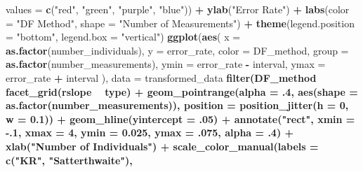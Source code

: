 \documentclass[12pt, twoside]{amherstthesis}
\newenvironment{Shaded}{\begin{snugshade}}{\end{snugshade}}
\newcommand{\DataTypeTok}[1]{\textcolor[rgb]{0.13,0.29,0.53}{#1}}
\newcommand{\DecValTok}[1]{\textcolor[rgb]{0.00,0.00,0.81}{#1}}
\newcommand{\FloatTok}[1]{\textcolor[rgb]{0.00,0.00,0.81}{#1}}
\newcommand{\KeywordTok}[1]{\textcolor[rgb]{0.13,0.29,0.53}{\textbf{#1}}}
\newcommand{\NormalTok}[1]{#1}
\newcommand{\OperatorTok}[1]{\textcolor[rgb]{0.81,0.36,0.00}{\textbf{#1}}}
\newcommand{\StringTok}[1]{\textcolor[rgb]{0.31,0.60,0.02}{#1}}
\begin{document}
\begin{Shaded}
\begin{Highlighting}[]
{{{{{{{{{{{{{                     \DataTypeTok{values =} \KeywordTok{c}\NormalTok{(}\StringTok{"red"}\NormalTok{, }\StringTok{"green"}\NormalTok{, }\StringTok{"purple"}\NormalTok{, }\StringTok{"blue"}\NormalTok{)) }\OperatorTok{+}
\StringTok{  }\KeywordTok{ylab}\NormalTok{(}\StringTok{"Error Rate"}\NormalTok{) }\OperatorTok{+}
\StringTok{  }\KeywordTok{labs}\NormalTok{(}\DataTypeTok{color =} \StringTok{"DF Method"}\NormalTok{, }\DataTypeTok{shape =} \StringTok{"Number of Measurements"}\NormalTok{) }\OperatorTok{+}
\StringTok{  }\KeywordTok{theme}\NormalTok{(}\DataTypeTok{legend.position =} \StringTok{"bottom"}\NormalTok{, }\DataTypeTok{legend.box =} \StringTok{"vertical"}\NormalTok{)}
\KeywordTok{ggplot}\NormalTok{(}\KeywordTok{aes}\NormalTok{(}
  \DataTypeTok{x =} \KeywordTok{as.factor}\NormalTok{(number_individuals), }\DataTypeTok{y =}\NormalTok{ error_rate,}
  \DataTypeTok{color =}\NormalTok{ DF_method, }\DataTypeTok{group =} \KeywordTok{as.factor}\NormalTok{(number_measurements), }
  \DataTypeTok{ymin =}\NormalTok{ error_rate }\OperatorTok{-}\StringTok{ }\NormalTok{interval, }\DataTypeTok{ymax =}\NormalTok{ error_rate }\OperatorTok{+}\StringTok{ }\NormalTok{interval}
\NormalTok{), }\DataTypeTok{data =}\NormalTok{ transformed_data }\OperatorTok{%>%}\StringTok{ }
\StringTok{  }\KeywordTok{filter}\NormalTok{(DF_method }\OperatorTok{%in%}\StringTok{ }\KeywordTok{c}\NormalTok{(}\StringTok{"KR_t1err_1"}\NormalTok{, }\StringTok{"S_t1err_1"}\NormalTok{))) }\OperatorTok{+}
\StringTok{  }\KeywordTok{facet_grid}\NormalTok{(rslope }\OperatorTok{~}\StringTok{ }\NormalTok{type) }\OperatorTok{+}
\StringTok{  }\KeywordTok{geom_pointrange}\NormalTok{(}\DataTypeTok{alpha =} \FloatTok{.4}\NormalTok{, }\KeywordTok{aes}\NormalTok{(}\DataTypeTok{shape =} \KeywordTok{as.factor}\NormalTok{(number_measurements)), }
                  \DataTypeTok{position =} \KeywordTok{position_jitter}\NormalTok{(}\DataTypeTok{h =} \DecValTok{0}\NormalTok{, }\DataTypeTok{w =} \FloatTok{0.1}\NormalTok{)) }\OperatorTok{+}
\StringTok{  }\KeywordTok{geom_hline}\NormalTok{(}\DataTypeTok{yintercept =} \FloatTok{.05}\NormalTok{) }\OperatorTok{+}
\StringTok{  }\KeywordTok{annotate}\NormalTok{(}\StringTok{"rect"}\NormalTok{, }\DataTypeTok{xmin =} \FloatTok{-.1}\NormalTok{, }\DataTypeTok{xmax =} \DecValTok{4}\NormalTok{, }\DataTypeTok{ymin =} \FloatTok{0.025}\NormalTok{, }\DataTypeTok{ymax =} \FloatTok{.075}\NormalTok{, }
           \DataTypeTok{alpha =} \FloatTok{.4}\NormalTok{) }\OperatorTok{+}
\StringTok{  }\KeywordTok{xlab}\NormalTok{(}\StringTok{"Number of Individuals"}\NormalTok{) }\OperatorTok{+}
\StringTok{  }\KeywordTok{scale_color_manual}\NormalTok{(}\DataTypeTok{labels =} \KeywordTok{c}\NormalTok{(}\StringTok{"KR"}\NormalTok{, }\StringTok{"Satterthwaite"}\NormalTok{), }
}}}}}}}}}}}}}}}
\end{Highlighting}
\end{Shaded}
\end{document}
